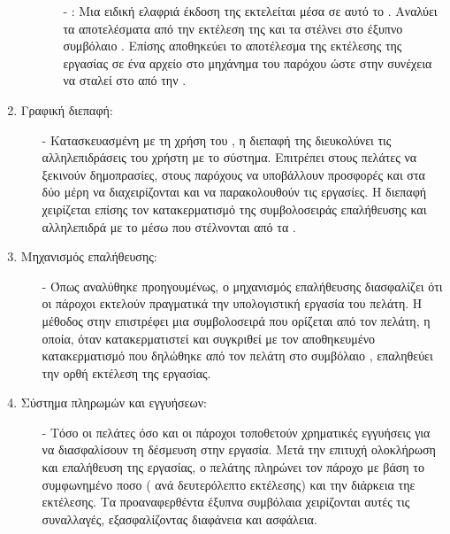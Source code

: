 \begin{enumerate}
\begin{itemize}
\begin{itemize}
            \item[-] : Μια ειδική ελαφριά έκδοση της  εκτελείται μέσα σε αυτό το . Αναλύει τα αποτελέσματα από την εκτέλεση της  και τα στέλνει στο έξυπνο συμβόλαιο . Επίσης αποθηκεύει το αποτέλεσμα της εκτέλεσης της εργασίας σε ένα αρχείο στο μηχάνημα του παρόχου ώστε στην συνέχεια να σταλεί στο  από την .
        \end{itemize}
    \end{itemize}
    \item Γραφική διεπαφή:
        \begin{itemize}
            \item[-] Κατασκευασμένη με τη χρήση του , η διεπαφή της  διευκολύνει τις αλληλεπιδράσεις του χρήστη με το σύστημα. Επιτρέπει στους πελάτες να ξεκινούν δημοπρασίες, στους παρόχους να υποβάλλουν προσφορές και στα δύο μέρη να διαχειρίζονται και να παρακολουθούν τις εργασίες. Η διεπαφή χειρίζεται επίσης τον κατακερματισμό της συμβολοσειράς επαλήθευσης και αλληλεπιδρά με το  μέσω  που στέλνονται από τα . 
        \end{itemize}
    \item Μηχανισμός επαλήθευσης:
     \begin{itemize}
        \item[-] Όπως αναλύθηκε προηγουμένως, ο μηχανισμός επαλήθευσης διασφαλίζει ότι οι πάροχοι εκτελούν πραγματικά την υπολογιστική εργασία του πελάτη. Η μέθοδος  στην  επιστρέφει μια συμβολοσειρά που ορίζεται από τον πελάτη, η οποία, όταν κατακερματιστεί και συγκριθεί με τον αποθηκευμένο κατακερματισμό που δηλώθηκε από τον πελάτη στο συμβόλαιο , επαληθεύει την ορθή εκτέλεση της εργασίας.
     \end{itemize}
    \item Σύστημα πληρωμών και εγγυήσεων: 
    \begin{itemize}
        \item[-] Τόσο οι πελάτες όσο και οι πάροχοι τοποθετούν χρηματικές εγγυήσεις για να διασφαλίσουν τη δέσμευση στην εργασία. Μετά την επιτυχή ολοκλήρωση και επαλήθευση της εργασίας, ο πελάτης πληρώνει τον πάροχο με βάση το συμφωνημένο ποσο ( ανά δευτερόλεπτο εκτέλεσης) και την διάρκεια τηε εκτέλεσης. Τα προαναφερθέντα έξυπνα συμβόλαια χειρίζονται αυτές τις συναλλαγές, εξασφαλίζοντας διαφάνεια και ασφάλεια.
    \end{itemize}
\end{enumerate}

